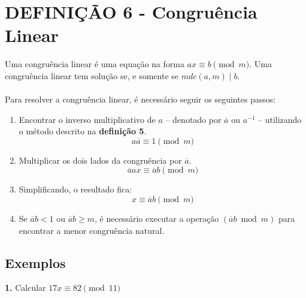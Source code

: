\section{DEFINIÇÃO 6 - Congruência Linear}
Uma congruência linear é uma equação na forma $ax \equiv b \pmod m$. Uma congruência linear tem solução se, e somente se $mdc(a,m) \mid b$.\\
\\
Para resolver a congruência linear, é necessário seguir os seguintes passos:

\begin{enumerate}

    \item Encontrar o inverso multiplicativo de $a$ -- denotado por $\overline{a}$ ou $a^{-1}$ -- utilizando o método descrito na \textbf{definição 5}.
          \[
              a \overline{a} \equiv 1 \pmod m
          \]

    \item Multiplicar os dois lados da congruência por $\overline{a}$.
          \[
              \overline{a}ax \equiv \overline{a}b \pmod m
          \]
    \item Simplificando, o resultado fica:
          \[
              x \equiv \overline{a}b \pmod m
          \]
    \item Se $\overline{a}b < 1$ ou $\overline{a}b \geq m$, é necessário executar a operação $(\overline{a}b \bmod m)$ para encontrar a menor congruência natural.

\end{enumerate}

\subsection*{Exemplos}
\textbf{1.} Calcular $17x \equiv 82 \pmod{11}$

